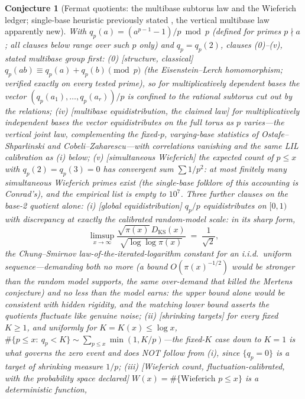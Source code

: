 \documentclass[11pt]{article}
\newtheorem{conjecture}{Conjecture}
\theoremstyle{definition}
\begin{document}
\setcounter{conjecture}{6}%
\begin{conjecture}[Fermat quotients: the multibase subtorus law and
the Wieferich ledger; single-base heuristic previously stated
\cite{CDP}, the vertical multibase law apparently new]\label{c23}
With $q_p(a)=(a^{p-1}-1)/p\bmod p$ (defined for primes $p\nmid a$;
all clauses below range over such $p$ only) and $q_p=q_p(2)$, clauses \emph{(0)}--\emph{(v)}, stated multibase group first:
\emph{(0)} [structure, classical] $q_p(ab)\equiv q_p(a)+q_p(b)
\pmod p$ (the Eisenstein--Lerch homomorphism; verified exactly on
every tested prime), so for multiplicatively \emph{dependent} bases
the vector $(q_p(a_1),\dots,q_p(a_r))/p$ is confined to the rational
subtorus cut out by the relations;
\emph{(iv)} [multibase equidistribution, the claimed law] for
multiplicatively \emph{independent} bases the vector equidistributes
on the full torus as $p$ varies---the \emph{vertical} joint law,
complementing the fixed-$p$, varying-base statistics of
Ostafe--Shparlinski and Cobeli--Zaharescu---with correlations
vanishing and the same LIL calibration as (i) below;
\emph{(v)} [simultaneous Wieferich] the expected count of $p\le x$
with $q_p(2)=q_p(3)=0$ has convergent sum $\sum1/p^2$: at most
finitely many simultaneous Wieferich primes exist (the single-base
folklore of this accounting is Conrad's), and the empirical list is
empty to $10^7$.  Three further clauses on the base-2 quotient
alone:
\emph{(i)} [global equidistribution] $q_p/p$ equidistributes on
$[0,1)$ with discrepancy at exactly the calibrated random-model
scale: in its sharp form,
\[
\limsup_{x\to\infty}
\frac{\sqrt{\pi(x)}\,D_{\mathrm{KS}}(x)}
{\sqrt{\log\log\pi(x)}}
\;=\;\frac1{\sqrt2},
\]
the Chung--Smirnov law-of-the-iterated-logarithm constant for an
i.i.d.\ uniform sequence---demanding both no more (a bound
$O(\pi(x)^{-1/2})$ would be \emph{stronger than the random model
supports}, the same over-demand that killed the Mertens conjecture)
and no less than the model earns: the upper bound alone would be consistent
with
hidden rigidity, and the matching lower bound asserts the quotients
fluctuate like genuine noise;
\emph{(ii)} [shrinking targets] for every fixed $K\ge1$, and uniformly
for $K=K(x)\le\log x$,
$\#\{p\le x:\ q_p<K\}\sim\sum_{p\le x}\min(1,K/p)$---the fixed-$K$
case down to $K=1$ is what governs the zero event and does NOT follow
from (i), since $\{q_p=0\}$ is a target of shrinking measure $1/p$;
\emph{(iii)} [Wieferich count, fluctuation-calibrated, with the
probability space declared]
$W(x)=\#\{\text{Wieferich } p\le x\}$ is a deterministic function,

\end{conjecture}
\end{document}
